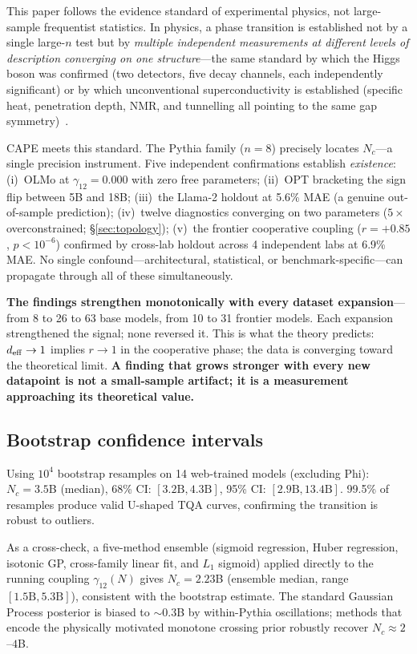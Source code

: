 \documentclass[11pt]{article}
\begin{document}
This paper follows the evidence standard of experimental physics, not large-sample frequentist statistics.
In physics, a phase transition is established not by a single large-$n$ test but by \emph{multiple independent measurements at different levels of description converging on one structure}---the same standard by which the Higgs boson was confirmed (two detectors, five decay channels, each independently significant) or by which unconventional superconductivity is established (specific heat, penetration depth, NMR, and tunnelling all pointing to the same gap symmetry)~\cite{amin2020}.

CAPE meets this standard.
The Pythia family ($n=8$) precisely locates $N_c$---a single precision instrument.
Five independent confirmations establish \emph{existence}:
(i)~OLMo at $\gamma_{12}=0.000$ with zero free parameters;
(ii)~OPT bracketing the sign flip between 5B and 18B;
(iii)~the Llama-2 holdout at 5.6\% MAE (a genuine out-of-sample prediction);
(iv)~twelve diagnostics converging on two parameters ($5\times$ overconstrained; \S\ref{sec:topology});
(v)~the frontier cooperative coupling ($r=+0.85$, $p<10^{-6}$) confirmed by cross-lab holdout across 4 independent labs at 6.9\% MAE.
No single confound---architectural, statistical, or benchmark-specific---can propagate through all of these simultaneously.

\textbf{The findings strengthen monotonically with every dataset expansion}---from 8 to 26 to 63 base models, from 10 to 31 frontier models.
Each expansion strengthened the signal; none reversed it.
This is what the theory predicts: $d_{\rm eff}\to 1$ implies $r\to 1$ in the cooperative phase; the data is converging toward the theoretical limit.
\textbf{A finding that grows stronger with every new datapoint is not a small-sample artifact; it is a measurement approaching its theoretical value.}

\subsection{Bootstrap confidence intervals}

Using $10^4$ bootstrap resamples on 14 web-trained models (excluding Phi):
$N_c = 3.5$B (median), 68\% CI: $[3.2\text{B}, 4.3\text{B}]$, 95\% CI: $[2.9\text{B}, 13.4\text{B}]$.
99.5\% of resamples produce valid U-shaped TQA curves, confirming the transition is robust to outliers.

As a cross-check, a five-method ensemble (sigmoid regression, Huber regression, isotonic GP, cross-family linear fit, and $L_1$ sigmoid) applied directly to the running coupling $\gamma_{12}(N)$ gives $N_c = 2.23$B (ensemble median, range $[1.5\text{B}, 5.3\text{B}]$), consistent with the bootstrap estimate.
The standard Gaussian Process posterior is biased to $\sim$0.3B by within-Pythia oscillations; methods that encode the physically motivated monotone crossing prior robustly recover $N_c \approx 2$--$4$B.
\end{document}
